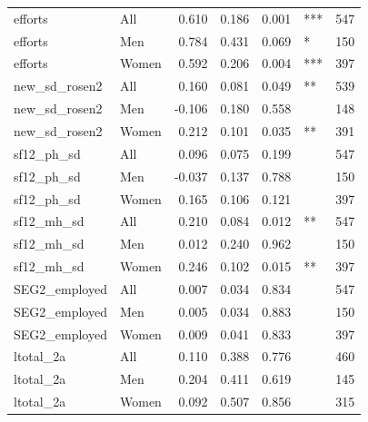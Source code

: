 \begin{table}
\begin{tabular}[t]{llrrrlr}
efforts & All & 0.610 & 0.186 & 0.001 & *** & 547\\
\addlinespace
efforts & Men & 0.784 & 0.431 & 0.069 & * & 150\\
efforts & Women & 0.592 & 0.206 & 0.004 & *** & 397\\
new\_sd\_rosen2 & All & 0.160 & 0.081 & 0.049 & ** & 539\\
new\_sd\_rosen2 & Men & -0.106 & 0.180 & 0.558 &  & 148\\
new\_sd\_rosen2 & Women & 0.212 & 0.101 & 0.035 & ** & 391\\
\addlinespace
sf12\_ph\_sd & All & 0.096 & 0.075 & 0.199 &  & 547\\
sf12\_ph\_sd & Men & -0.037 & 0.137 & 0.788 &  & 150\\
sf12\_ph\_sd & Women & 0.165 & 0.106 & 0.121 &  & 397\\
sf12\_mh\_sd & All & 0.210 & 0.084 & 0.012 & ** & 547\\
sf12\_mh\_sd & Men & 0.012 & 0.240 & 0.962 &  & 150\\
\addlinespace
sf12\_mh\_sd & Women & 0.246 & 0.102 & 0.015 & ** & 397\\
SEG2\_employed & All & 0.007 & 0.034 & 0.834 &  & 547\\
SEG2\_employed & Men & 0.005 & 0.034 & 0.883 &  & 150\\
SEG2\_employed & Women & 0.009 & 0.041 & 0.833 &  & 397\\
ltotal\_2a & All & 0.110 & 0.388 & 0.776 &  & 460\\
\addlinespace
ltotal\_2a & Men & 0.204 & 0.411 & 0.619 &  & 145\\
ltotal\_2a & Women & 0.092 & 0.507 & 0.856 &  & 315\\
\bottomrule
\end{tabular}
\end{table}
